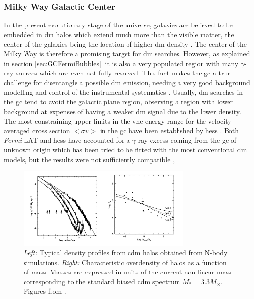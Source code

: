 \documentclass[main.tex]{subfiles}
\begin{document}
\subsubsection{Milky Way Galactic Center}

In the present evolutionary stage of the universe, galaxies are believed to be embedded in \gls{dm} halos which extend much more than the visible matter, the center of the galaxies being the location of higher \gls{dm} density \cite{navarro_1996}. The center of the Milky Way is therefore a promising target for \gls{dm} searches. However, as explained in section \ref{sec:GCFermiBubbles}, it is also a very populated region with many $\gamma$-ray sources which are even not fully resolved. This fact makes the \gls{gc} a true challenge for disentangle a possible \gls{dm} emission, needing a very good background modelling and control of the instrumental systematics \cite{2019CTAScienceCase}. Usually, \gls{dm} searches in the \gls{gc} tend to avoid the galactic plane region, observing a region with lower background at expenses of having a weaker \gls{dm} signal due to the lower density.\\
The most constraining upper limits in the \gls{vhe} energy range for the velocity averaged cross section $<\sigma v>$ in the \gls{gc} have been established by \gls{hess} \cite{2011HESSGClimits}. Both \textit{Fermi}-LAT and \gls{hess} have accounted for a $\gamma$-ray excess coming from the \gls{gc} of unknown origin which has been tried to be fitted with the most conventional \gls{dm} models, but the results were not sufficiently compatible \cite{2006HESSGCexcess}, \cite{2017FermiGCexcess}.\\

\begin{figure}
\centering
 \includegraphics[width=0.77\textwidth]{Pictures/DMhalos.pdf}
  \caption{\textit{Left:} Typical density profiles from \gls{cdm} halos obtained from N-body simulations. \textit{Right:} Characteristic overdensity of halos as a function of mass. Masses are expressed in units of the current non linear mass corresponding to the standard biased \gls{cdm} spectrum $M_{*}=3.3 M_{\odot}$. Figures from \cite{navarro_1996}.}
    \label{fig:DMhalos}
\end{figure}
\end{document}
